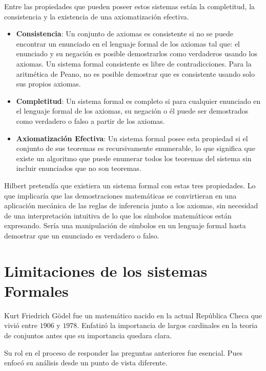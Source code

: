 \documentclass[14pt]{extarticle}
\begin{document}
Entre las propiedades que pueden poseer estos sistemas están la completitud, la consistencia y la existencia de una axiomatización efectiva. \cite{enderton2001mathematical}

\begin{itemize}
    \item \textbf{Consistencia}: Un conjunto de axiomas es consistente si no se puede encontrar un enunciado en el lenguaje formal de los axiomas tal que: el enunciado y su negación es posible demostrarlos como verdaderos usando los axiomas. Un sistema formal consistente es libre de contradicciones. Para la aritmética de Peano, no es posible demostrar que es consistente usando solo sus propios axiomas.

    \item \textbf{Completitud}: Un sistema formal es completo si para cualquier enunciado en el lenguaje formal de los axiomas, su negación o él puede ser demostrados como verdadero o falso a partir de los axiomas. 

    \item \textbf{Axiomatización Efectiva}: Un sistema formal posee esta propiedad si el conjunto de sus teoremas es recursivamente enumerable, lo que significa que existe un algoritmo que puede enumerar todos los teoremas del sistema sin incluir enunciados que no son teoremas.
\end{itemize}

Hilbert pretendía que existiera un sistema formal con estas tres propiedades. Lo que implicaría que las demostraciones matemáticas se convirtieran en una aplicación mecánica de las reglas de inferencia junto a los axiomas, sin necesidad de una interpretación intuitiva de lo que los símbolos matemáticos están expresando. Sería una manipulación de símbolos en un lenguaje formal hasta demostrar que un enunciado es verdadero o falso.

\section{Limitaciones de los sistemas Formales}

Kurt Friedrich Gödel fue un matemático nacido en la actual República Checa que vivió entre $1906$ y $1978$. Enfatizó la importancia de largos cardinales en la teoria de conjuntos antes que su importancia quedara clara.  \cite{goedel}

Su rol en el proceso de responder las preguntas anteriores fue esencial. Pues enfocó su análisis desde un punto de vista diferente. 
\end{document}
